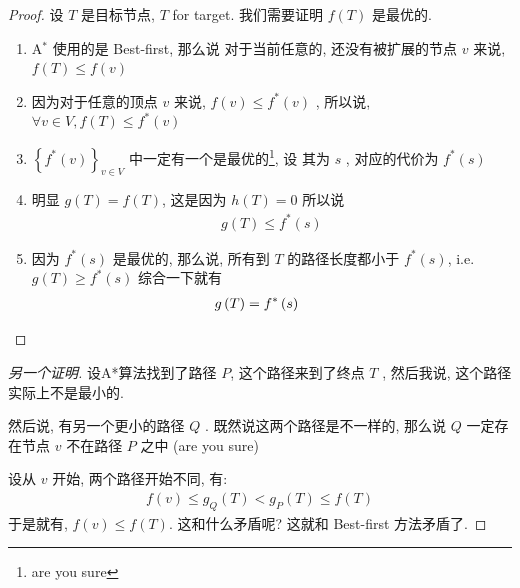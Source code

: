 \documentclass[a4paper, 10pt]{ctexart} %
\begin{document}
\begin{proof}
设 $T$ 是目标节点, $T$ for target. 我们需要证明 $f\left(T\right)$ 是最优的.
\begin{enumerate}
    \item A$^{*}$ 使用的是 Best-first, 那么说 对于当前任意的, 还没有被扩展的节点 $v$
    来说, $f\left(T\right) \le f \left(v\right)$
    \item 因为对于任意的顶点 $v$ 来说, $f \left( v\right) \le f ^{*} \left(v\right)$ ,
所以说, $\forall  v \in V, f \left(T \right) \le f ^{*} \left(v\right)$
    \item $\left\{ f^*\left(v\right)\right\}_{v \in V}$ 中一定有一个是最优的\footnote{are you sure}, 设
    其为 $s$ , 对应的代价为 $f ^{*} \left(s\right)$ 
    \item 明显 $g \left(T\right) =  f\left(T\right)$, 这是因为 $h \left(T\right)   = 0 $  
    所以说 
    \begin{align*}
        g\left(T\right)  \le f ^{*} \left(s\right)
    \end{align*}
    \item 因为 $f ^{*} \left(s\right) $ 是最优的, 那么说, 所有到 $T$ 的路径长度都小于 $f^{*} \left(s\right)$, i.e. $g\left(T\right) \ge f^{*} \left(s\right)$
    综合一下就有 
    \begin{align*}
        g\left(T\right) = f ^{*} \left(s \right) \quad \quad \qedhere
    \end{align*} 
\end{enumerate}
\end{proof}

\begin{proof}[另一个证明]
    设A*算法找到了路径 $P$, 这个路径来到了终点 $T$ , 然后我说, 这个路径实际上不是最小的. 
    
    然后说, 有另一个更小的路径 $Q$ . 既然说这两个路径是不一样的, 
    那么说 $Q$ 一定存在节点 $v$
    不在路径 $P$ 之中 (are you sure)
    
    设从 $v$ 开始, 两个路径开始不同, 有:
    \begin{align*}
        f\left(v\right) \le g_{Q}\left(T\right)  < g_{P}\left(T\right) \le f\left(T\right)
    \end{align*}
    于是就有, $f \left(v\right) \le f \left(T\right)$. 这和什么矛盾呢? 
    这就和 Best-first 方法矛盾了.
\end{proof}
\end{document}
